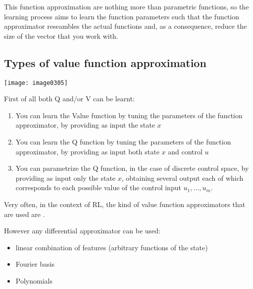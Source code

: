 This function approximation are nothing more than parametric functions, so the learning process aims to learn the function parameters such that the function approximator reseambles the actual functions and, as a consequence, reduce the size of the vector that you work with.


\subsection{Types of value function approximation}

\begin{minipage}{0.3\textwidth}
\centering
\texttt{[image: image0305]}
\end{minipage}
\hfill
\begin{minipage}{.7\textwidth}
First of all both Q and/or V can be learnt:
\begin{enumerate}
\item You can learn the Value function by tuning the parameters of the function approximator, by providing as input the state $x$
\item You can learn the Q function by tuning the parameters of the function approximator, by providing as input both state $x$ and control $u$
\item You can parametrize the Q function, in the case of discrete control space, by providing as input only the state $x$, obtaining several output each of which corresponds to each possible value of the control input $u_1, ..., u_m$.
\end{enumerate} 

\end{minipage}

Very often, in the context of RL, the kind of value function approximators that are used are .

However any differential approximator can be used:
\begin{itemize}
\item linear combination of features (arbitrary functions of the state)
\item Fourier basis
\item Polynomials
\end{itemize}








